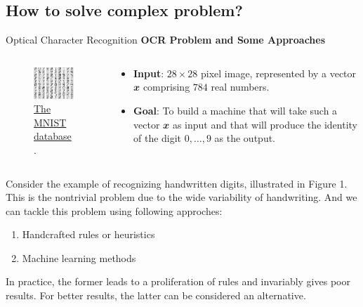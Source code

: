\documentclass{bredelebeamer}
\begin{document}
\subsection{How to solve complex problem?}
\begin{frame}{Optical Character Recognition}
  \textbf{OCR Problem and Some Approaches}
  \begin{columns}
    \begin{column}{0.3\textwidth}
      \begin{figure}
      \centering
      \includegraphics[scale=0.5]{mnist_pic.png}
      \caption{
        \href{https://en.wikipedia.org/wiki/MNIST_database}{The MNIST database}.
      }
      \end{figure}
    \end{column}
    \begin{column}{0.7\textwidth}
      \begin{itemize}
        \item \textbf{Input}: ${28}\times{28}$ pixel image, represented by
              a vector $\mathbfit{x}$ comprising $784$ real numbers.
        \item \textbf{Goal}: To build a machine that will take such
              a vector $\mathbfit{x}$ as input and that will produce
              the identity of the digit $0,\ldots,9$ as the output.
      \end{itemize}
    \end{column}
  \end{columns}
  Consider the example of recognizing handwritten digits, illustrated in Figure
  1. This is the nontrivial problem due to the wide variability of handwriting.
  And we can tackle this problem using following approches:
  \begin{enumerate}
    \item Handcrafted rules or heuristics
    \item Machine learning methods
  \end{enumerate}
  In practice, the former leads to a proliferation of rules
  and invariably gives poor results. For better results, the
  latter can be considered an alternative.
\end{frame}
\end{document}
